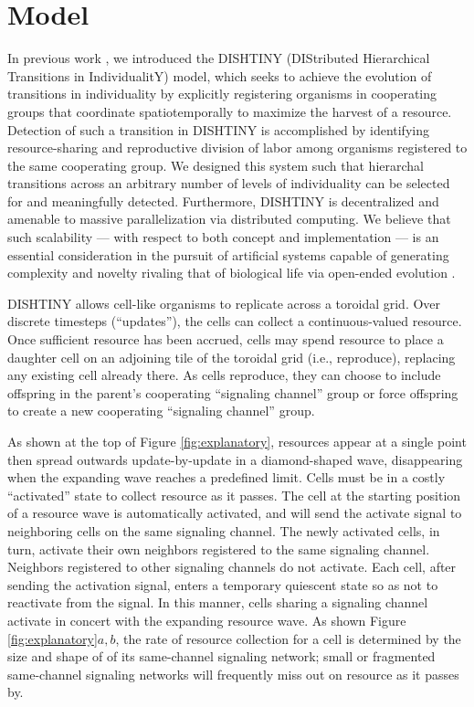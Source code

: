 \section{Model}



In previous work \cite{moreno2018toward}, we introduced the DISHTINY (DIStributed Hierarchical Transitions in IndividualitY) model, which seeks to achieve the evolution of transitions in individuality by explicitly registering organisms in cooperating groups that coordinate spatiotemporally to maximize the harvest of a resource.
Detection of such a transition in DISHTINY is accomplished by identifying resource-sharing and reproductive division of labor among organisms registered to the same cooperating group.
We designed this system such that hierarchal transitions across an arbitrary number of levels of individuality can be selected for and meaningfully detected.
Furthermore, DISHTINY is decentralized and amenable to massive parallelization via distributed computing.
We believe that such scalability --- with respect to both concept and implementation --- is an essential consideration in the pursuit of artificial systems capable of generating complexity and novelty rivaling that of biological life via open-ended evolution \cite{ackley2011pursue, ackley2016indefinite}.

DISHTINY allows cell-like organisms to replicate across a toroidal grid.
Over discrete timesteps (``updates''), the cells can collect a continuous-valued resource.
Once sufficient resource has been accrued, cells may spend resource to place a daughter cell on an adjoining tile of the toroidal grid (i.e., reproduce), replacing any existing cell already there.
As cells reproduce, they can choose to include offspring in the parent's cooperating ``signaling channel'' group or force offspring to create a new cooperating ``signaling channel'' group.

As shown at the top of Figure \ref{fig:explanatory}, resources appear at a single point then spread outwards update-by-update in a diamond-shaped wave, disappearing when the expanding wave reaches a predefined limit.
Cells must be in a costly ``activated'' state to collect resource as it passes.
The cell at the starting position of a resource wave is automatically activated, and will send the activate signal to neighboring cells on the same signaling channel.
The newly activated cells, in turn, activate their own neighbors registered to the same signaling channel.
Neighbors registered to other signaling channels do not activate.
Each cell, after sending the activation signal, enters a temporary quiescent state so as not to reactivate from the signal.
In this manner, cells sharing a signaling channel activate in concert with the expanding resource wave.
As shown Figure \ref{fig:explanatory}$a,b$, the rate of resource collection for a cell is determined by the size and shape of of its same-channel signaling network;
small or fragmented same-channel signaling networks will frequently miss out on resource as it passes by.

